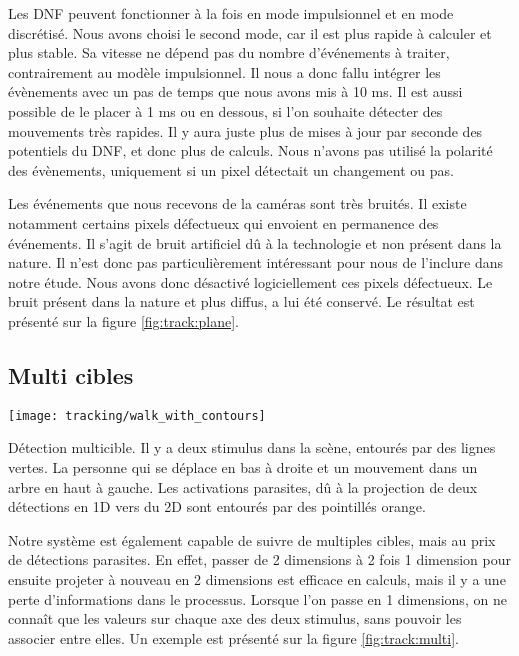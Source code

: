 	Les DNF peuvent fonctionner à la fois en mode impulsionnel et en mode discrétisé. Nous avons choisi le second mode, car il est plus rapide à calculer et plus stable. Sa vitesse ne dépend pas du nombre d'événements à traiter, contrairement au modèle impulsionnel. Il nous a donc fallu intégrer les évènements avec un pas de temps que nous avons mis à 10 ms. Il est aussi possible de le placer à 1 ms ou en dessous, si l'on souhaite détecter des mouvements très rapides. Il y aura juste plus de mises à jour par seconde des potentiels du DNF, et donc plus de calculs. Nous n'avons pas utilisé la polarité des évènements, uniquement si un pixel détectait un changement ou pas.

	Les événements que nous recevons de la caméras sont très bruités. Il existe notamment certains pixels défectueux qui envoient en permanence des événements. Il s'agit de bruit artificiel dû à la technologie et non présent dans la nature. Il n'est donc pas particulièrement intéressant pour nous de l'inclure dans notre étude. Nous avons donc désactivé logiciellement ces pixels défectueux. Le bruit présent dans la nature et plus diffus, a lui été conservé. Le résultat est présenté sur la figure \ref{fig:track:plane}.

	\subsection{Multi cibles}

	\begin{figureth}
		\begin{subfigureth}{\textwidth}
			\texttt{[image: tracking/walk\_with\_contours]}
		\end{subfigureth}
		\caption[Détection de mouvements multicible avec DNF sur caméra événementielle]{Détection multicible. Il y a deux stimulus dans la scène, entourés par des lignes vertes. La personne qui se déplace en bas à droite et un mouvement dans un arbre en haut à gauche. Les activations parasites, dû à la projection de deux détections en 1D vers du 2D sont entourés par des pointillés orange.}\label{fig:track:multi}
	\end{figureth}

	Notre système est également capable de suivre de multiples cibles, mais au prix de détections parasites. En effet, passer de 2 dimensions à 2 fois 1 dimension pour ensuite projeter à nouveau en 2 dimensions est efficace en calculs, mais il y a une perte d'informations dans le processus. Lorsque l'on passe en 1 dimensions, on ne connaît que les valeurs sur chaque axe des deux stimulus, sans pouvoir les associer entre elles. Un exemple est présenté sur la figure \ref{fig:track:multi}.

